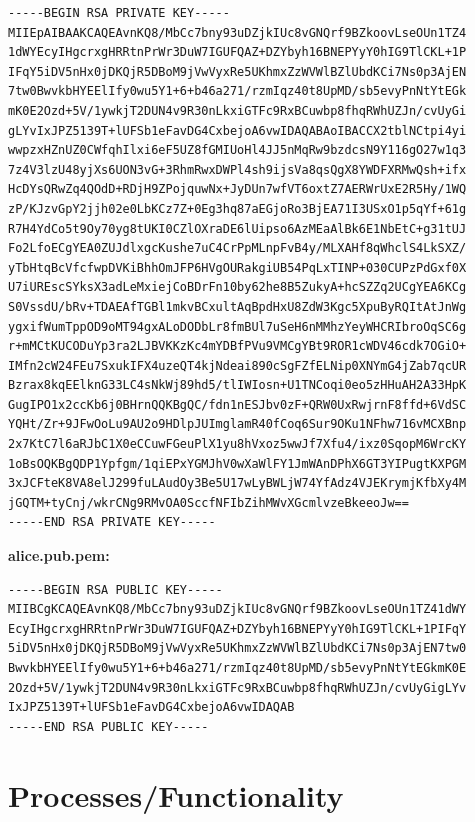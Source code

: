 \documentclass{article}[12pt]
\begin{document}
		\begin{lstlisting}[language={}]
-----BEGIN RSA PRIVATE KEY-----
MIIEpAIBAAKCAQEAvnKQ8/MbCc7bny93uDZjkIUc8vGNQrf9BZkoovLseOUn1TZ4
1dWYEcyIHgcrxgHRRtnPrWr3DuW7IGUFQAZ+DZYbyh16BNEPYyY0hIG9TlCKL+1P
IFqY5iDV5nHx0jDKQjR5DBoM9jVwVyxRe5UKhmxZzWVWlBZlUbdKCi7Ns0p3AjEN
7tw0BwvkbHYEElIfy0wu5Y1+6+b46a271/rzmIqz40t8UpMD/sb5evyPnNtYtEGk
mK0E2Ozd+5V/1ywkjT2DUN4v9R30nLkxiGTFc9RxBCuwbp8fhqRWhUZJn/cvUyGi
gLYvIxJPZ5139T+lUFSb1eFavDG4CxbejoA6vwIDAQABAoIBACCX2tblNCtpi4yi
wwpzxHZnUZ0CWfqhIlxi6eF5UZ8fGMIUoHl4JJ5nMqRw9bzdcsN9Y116gO27w1q3
7z4V3lzU48yjXs6UON3vG+3RhmRwxDWPl4sh9ijsVa8qsQgX8YWDFXRMwQsh+ifx
HcDYsQRwZq4QOdD+RDjH9ZPojquwNx+JyDUn7wfVT6oxtZ7AERWrUxE2R5Hy/1WQ
zP/KJzvGpY2jjh02e0LbKCz7Z+0Eg3hq87aEGjoRo3BjEA71I3USxO1p5qYf+61g
R7H4YdCo5t9Oy70yg8tUKI0CZlOXraDE6lUipso6AzMEaAlBk6E1NbEtC+g31tUJ
Fo2LfoECgYEA0ZUJdlxgcKushe7uC4CrPpMLnpFvB4y/MLXAHf8qWhclS4LkSXZ/
yTbHtqBcVfcfwpDVKiBhhOmJFP6HVgOURakgiUB54PqLxTINP+030CUPzPdGxf0X
U7iUREscSYksX3adLeMxiejCoBDrFn10by62he8B5ZukyA+hcSZZq2UCgYEA6KCg
S0VssdU/bRv+TDAEAfTGBl1mkvBCxultAqBpdHxU8ZdW3Kgc5XpuByRQItAtJnWg
ygxifWumTppOD9oMT94gxALoDODbLr8fmBUl7uSeH6nMMhzYeyWHCRIbroOqSC6g
r+mMCtKUCODuYp3ra2LJBVKKzKc4mYDBfPVu9VMCgYBt9ROR1cWDV46cdk7OGiO+
IMfn2cW24FEu7SxukIFX4uzeQT4kjNdeai890cSgFZfELNip0XNYmG4jZab7qcUR
Bzrax8kqEElknG33LC4sNkWj89hd5/tlIWIosn+U1TNCoqi0eo5zHHuAH2A33HpK
GugIPO1x2ccKb6j0BHrnQQKBgQC/fdn1nESJbv0zF+QRW0UxRwjrnF8ffd+6VdSC
YQHt/Zr+9JFwOoLu9AU2o9HDlpJUImglamR40fCoq6Sur9OKu1NFhw716vMCXBnp
2x7KtC7l6aRJbC1X0eCCuwFGeuPlX1yu8hVxoz5wwJf7Xfu4/ixz0SqopM6WrcKY
1oBsOQKBgQDP1Ypfgm/1qiEPxYGMJhV0wXaWlFY1JmWAnDPhX6GT3YIPugtKXPGM
3xJCFteK8VA8elJ299fuLAudOy3Be5U17wLyBWLjW74YfAdz4VJEKrymjKfbXy4M
jGQTM+tyCnj/wkrCNg9RMvOA0SccfNFIbZihMWvXGcmlvzeBkeeoJw==
-----END RSA PRIVATE KEY-----
		\end{lstlisting}
		
		\textbf{alice.pub.pem:}
		
		\begin{lstlisting}[language={}]
-----BEGIN RSA PUBLIC KEY-----
MIIBCgKCAQEAvnKQ8/MbCc7bny93uDZjkIUc8vGNQrf9BZkoovLseOUn1TZ41dWY
EcyIHgcrxgHRRtnPrWr3DuW7IGUFQAZ+DZYbyh16BNEPYyY0hIG9TlCKL+1PIFqY
5iDV5nHx0jDKQjR5DBoM9jVwVyxRe5UKhmxZzWVWlBZlUbdKCi7Ns0p3AjEN7tw0
BwvkbHYEElIfy0wu5Y1+6+b46a271/rzmIqz40t8UpMD/sb5evyPnNtYtEGkmK0E
2Ozd+5V/1ywkjT2DUN4v9R30nLkxiGTFc9RxBCuwbp8fhqRWhUZJn/cvUyGigLYv
IxJPZ5139T+lUFSb1eFavDG4CxbejoA6vwIDAQAB
-----END RSA PUBLIC KEY-----
		\end{lstlisting}
	\newpage
	
	\section{Processes/Functionality}
\end{document}
